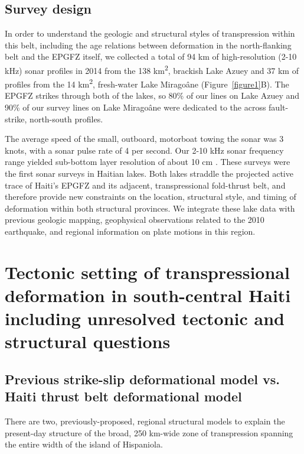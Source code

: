 \documentclass[linenumbers,draft]{agujournal}
\begin{document}
\subsection{Survey design}
In order to understand the geologic and structural styles of transpression within this belt, including the age relations between deformation in the north-flanking belt and the EPGFZ itself, we collected a total of 94 km of high-resolution (2-10 kHz) sonar profiles in 2014 from the 138 km\textsuperscript{2}, brackish Lake Azuey and 37 km of profiles from the 14 km\textsuperscript{2}, fresh-water Lake Mirago\^ane (Figure~\ref{figure1}B). The EPGFZ strikes through both of the lakes, so 80\% of our lines on Lake Azuey and 90\% of our survey lines on Lake Mirago\^ane were dedicated to the across fault-strike, north-south profiles. 

The average speed of the small, outboard, motorboat towing the sonar was 3 knots, with a sonar pulse rate of 4 per second. Our 2-10 kHz sonar frequency range yielded sub-bottom layer resolution of about 10 cm \citep{wang2015inferring}. These surveys were the first sonar surveys in Haitian lakes. Both lakes straddle the projected active trace of Haiti's EPGFZ and its adjacent, transpressional fold-thrust belt, and therefore provide new constraints on the location, structural style, and timing of deformation within both structural provinces. We integrate these lake data with previous geologic mapping, geophysical observations related to the 2010 earthquake, and regional information on plate motions in this region. 

\section{Tectonic setting of transpressional deformation in south-central Haiti including unresolved tectonic and structural questions}
\label{sec:tectonic}
\subsection{Previous strike-slip deformational model vs. Haiti thrust belt deformational model}
There are two, previously-proposed, regional structural models to explain the present-day structure of the broad, 250 km-wide zone of transpression spanning the entire width of the island of Hispaniola.
\end{document}
